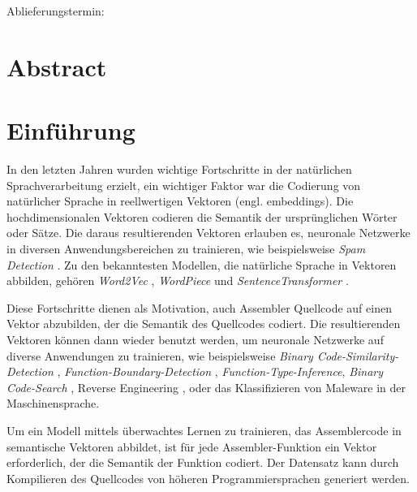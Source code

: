 \documentclass[12pt,letterpaper,ngerman]{article}
\begin{document}
\begin{center}
\begin{large}
Ablieferungstermin: \date{\today} 
\end{large}
\end{center}

\vspace{1,5cm}

\newpage
\tableofcontents
\newpage

\setcounter{page}{1}
\pagestyle{fancy}
\fancyhf{}
\fancyhead[R]{\thepage}
\renewcommand{\headrulewidth}{0pt} %
\newtheorem{definition}{Definition}
\section*{Abstract}
\section{Einführung}
In den letzten Jahren wurden wichtige Fortschritte in der natürlichen
Sprachverarbeitung erzielt, ein wichtiger Faktor war die Codierung von
natürlicher Sprache in reellwertigen Vektoren (engl. embeddings). Die hochdimensionalen Vektoren
codieren die Semantik der ursprünglichen Wörter oder Sätze. Die daraus 
resultierenden Vektoren erlauben es, neuronale Netzwerke in diversen 
Anwendungsbereichen zu trainieren, wie beispielsweise
\textit{Spam Detection} \cite{Ball2019}.  
Zu den bekanntesten Modellen, die natürliche Sprache in Vektoren abbilden, gehören 
\textit{Word2Vec} \cite{word2vec},
\textit{WordPiece} \cite{wu2016googlesneuralmachinetranslation} und
\textit{SentenceTransformer} \cite{reimers-2019-sentence-bert}. 

Diese Fortschritte dienen als Motivation, auch Assembler Quellcode auf einen 
Vektor abzubilden, der die Semantik des Quellcodes codiert. Die resultierenden
Vektoren können dann wieder benutzt werden, um neuronale Netzwerke auf
diverse Anwendungen zu trainieren, wie beispielsweise
\textit{Binary Code-Similarity-Detection} \cite{jtrans},
\textit{Function-Boundary-Detection} \cite{190918},
\textit{Function-Type-Inference}\cite{203650},
\textit{Binary Code-Search} \cite{9345532},
Reverse Engineering \cite{reverse-engeneering},
oder das Klassifizieren von 
Maleware in der Maschinensprache\cite{maleware-detection}.

Um ein Modell mittels überwachtes Lernen zu trainieren, das Assemblercode in 
semantische Vektoren abbildet, ist für jede Assembler-Funktion ein Vektor 
erforderlich, der die Semantik der Funktion codiert. Der Datensatz kann durch 
Kompilieren des Quellcodes von höheren Programmiersprachen generiert 
werden.
\end{document}
